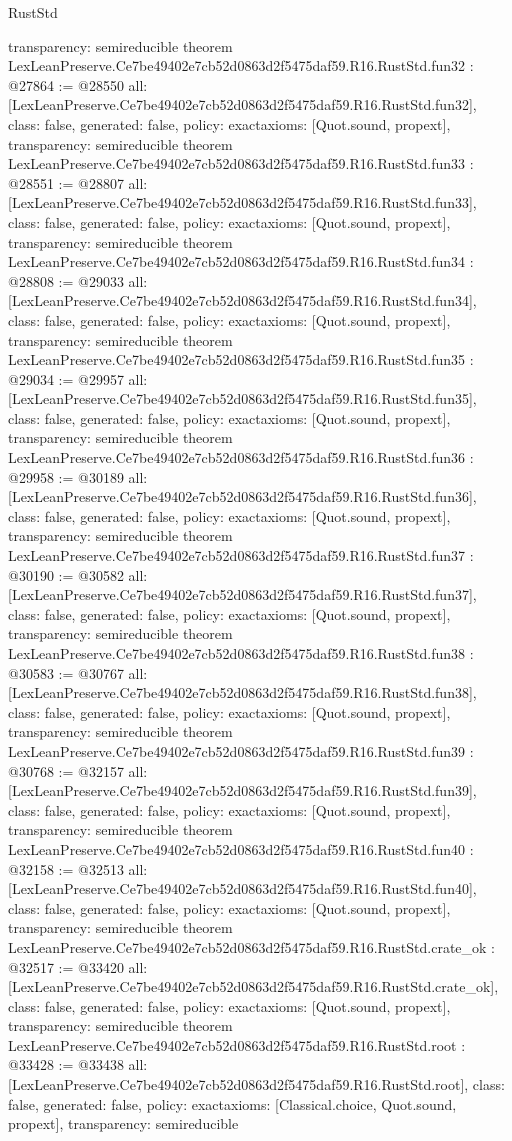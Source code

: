 \begin{lexlean}{RustStd}
\begin{coremodule}
{  transparency: semireducible
}
theorem LexLeanPreserve.Ce7be49402e7cb52d0863d2f5475daf59.R16.RustStd.fun32 : @27864 := @28550 {
  all: [LexLeanPreserve.Ce7be49402e7cb52d0863d2f5475daf59.R16.RustStd.fun32],
  class: false,
  generated: false,
  policy: exact{axioms: [Quot.sound, propext]},
  transparency: semireducible
}
theorem LexLeanPreserve.Ce7be49402e7cb52d0863d2f5475daf59.R16.RustStd.fun33 : @28551 := @28807 {
  all: [LexLeanPreserve.Ce7be49402e7cb52d0863d2f5475daf59.R16.RustStd.fun33],
  class: false,
  generated: false,
  policy: exact{axioms: [Quot.sound, propext]},
  transparency: semireducible
}
theorem LexLeanPreserve.Ce7be49402e7cb52d0863d2f5475daf59.R16.RustStd.fun34 : @28808 := @29033 {
  all: [LexLeanPreserve.Ce7be49402e7cb52d0863d2f5475daf59.R16.RustStd.fun34],
  class: false,
  generated: false,
  policy: exact{axioms: [Quot.sound, propext]},
  transparency: semireducible
}
theorem LexLeanPreserve.Ce7be49402e7cb52d0863d2f5475daf59.R16.RustStd.fun35 : @29034 := @29957 {
  all: [LexLeanPreserve.Ce7be49402e7cb52d0863d2f5475daf59.R16.RustStd.fun35],
  class: false,
  generated: false,
  policy: exact{axioms: [Quot.sound, propext]},
  transparency: semireducible
}
theorem LexLeanPreserve.Ce7be49402e7cb52d0863d2f5475daf59.R16.RustStd.fun36 : @29958 := @30189 {
  all: [LexLeanPreserve.Ce7be49402e7cb52d0863d2f5475daf59.R16.RustStd.fun36],
  class: false,
  generated: false,
  policy: exact{axioms: [Quot.sound, propext]},
  transparency: semireducible
}
theorem LexLeanPreserve.Ce7be49402e7cb52d0863d2f5475daf59.R16.RustStd.fun37 : @30190 := @30582 {
  all: [LexLeanPreserve.Ce7be49402e7cb52d0863d2f5475daf59.R16.RustStd.fun37],
  class: false,
  generated: false,
  policy: exact{axioms: [Quot.sound, propext]},
  transparency: semireducible
}
theorem LexLeanPreserve.Ce7be49402e7cb52d0863d2f5475daf59.R16.RustStd.fun38 : @30583 := @30767 {
  all: [LexLeanPreserve.Ce7be49402e7cb52d0863d2f5475daf59.R16.RustStd.fun38],
  class: false,
  generated: false,
  policy: exact{axioms: [Quot.sound, propext]},
  transparency: semireducible
}
theorem LexLeanPreserve.Ce7be49402e7cb52d0863d2f5475daf59.R16.RustStd.fun39 : @30768 := @32157 {
  all: [LexLeanPreserve.Ce7be49402e7cb52d0863d2f5475daf59.R16.RustStd.fun39],
  class: false,
  generated: false,
  policy: exact{axioms: [Quot.sound, propext]},
  transparency: semireducible
}
theorem LexLeanPreserve.Ce7be49402e7cb52d0863d2f5475daf59.R16.RustStd.fun40 : @32158 := @32513 {
  all: [LexLeanPreserve.Ce7be49402e7cb52d0863d2f5475daf59.R16.RustStd.fun40],
  class: false,
  generated: false,
  policy: exact{axioms: [Quot.sound, propext]},
  transparency: semireducible
}
theorem LexLeanPreserve.Ce7be49402e7cb52d0863d2f5475daf59.R16.RustStd.crate_ok : @32517 := @33420 {
  all: [LexLeanPreserve.Ce7be49402e7cb52d0863d2f5475daf59.R16.RustStd.crate_ok],
  class: false,
  generated: false,
  policy: exact{axioms: [Quot.sound, propext]},
  transparency: semireducible
}
theorem LexLeanPreserve.Ce7be49402e7cb52d0863d2f5475daf59.R16.RustStd.root : @33428 := @33438 {
  all: [LexLeanPreserve.Ce7be49402e7cb52d0863d2f5475daf59.R16.RustStd.root],
  class: false,
  generated: false,
  policy: exact{axioms: [Classical.choice, Quot.sound, propext]},
  transparency: semireducible
}


\end{coremodule}
\end{lexlean}
